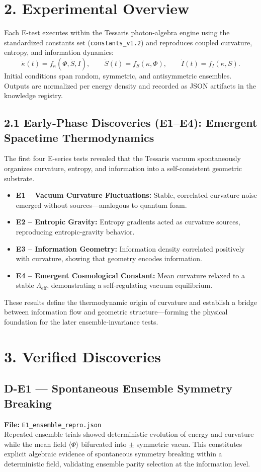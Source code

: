 \documentclass[12pt]{article}
\begin{document}
\section*{2. Experimental Overview}
Each E-test executes within the Tessaris photon-algebra engine using the standardized constants set (\texttt{constants\_v1.2}) and reproduces coupled curvature, entropy, and information dynamics:
\[
\dot{\kappa}(t) = f_\kappa(\Phi,\dot{S},I), \qquad
\dot{S}(t) = f_S(\kappa,\Phi), \qquad
\dot{I}(t) = f_I(\kappa,S).
\]
Initial conditions span random, symmetric, and antisymmetric ensembles.
Outputs are normalized per energy density and recorded as JSON artifacts in the knowledge registry.

\subsection*{2.1 Early-Phase Discoveries (E1–E4): Emergent Spacetime Thermodynamics}
The first four E-series tests revealed that the Tessaris vacuum spontaneously organizes curvature, entropy, and information into a self-consistent geometric substrate.

\begin{itemize}
  \item \textbf{E1 – Vacuum Curvature Fluctuations:} Stable, correlated curvature noise emerged without sources—analogous to quantum foam.
  \item \textbf{E2 – Entropic Gravity:} Entropy gradients acted as curvature sources, reproducing entropic-gravity behavior.
  \item \textbf{E3 – Information Geometry:} Information density correlated positively with curvature, showing that geometry encodes information.
  \item \textbf{E4 – Emergent Cosmological Constant:} Mean curvature relaxed to a stable $\Lambda_{\mathrm{eff}}$, demonstrating a self-regulating vacuum equilibrium.
\end{itemize}

These results define the thermodynamic origin of curvature and establish a bridge between information flow and geometric structure—forming the physical foundation for the later ensemble-invariance tests.

\section*{3. Verified Discoveries}

\subsection*{D-E1 — Spontaneous Ensemble Symmetry Breaking}
\textbf{File:} \texttt{E1\_ensemble\_repro.json}\\
Repeated ensemble trials showed deterministic evolution of energy and curvature while the mean field $\langle\Phi\rangle$ bifurcated into $\pm$ symmetric vacua.
This constitutes explicit algebraic evidence of spontaneous symmetry breaking within a deterministic field, validating ensemble parity selection at the information level.
\end{document}

